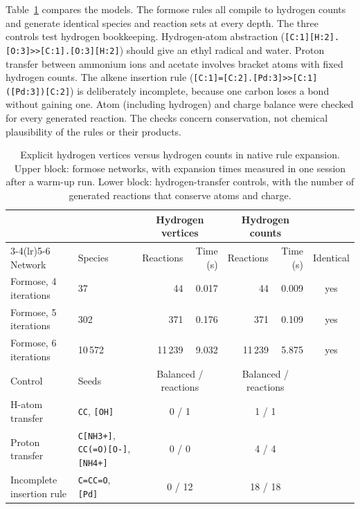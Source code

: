 \documentclass[pdflatex,referee]{../template/sn-jnl}
\theoremstyle{plain}%
\theoremstyle{definition}%
\theoremstyle{remark}%
\begin{document}
Table~\ref{tab:hydrogen_models} compares the models. The formose rules all compile to hydrogen counts and generate identical species and reaction sets at every depth. The three controls test hydrogen bookkeeping. Hydrogen-atom abstraction (\texttt{[C:1][H:2].[O:3]>>[C:1].[O:3][H:2]}) should give an ethyl radical and water. Proton transfer between ammonium ions and acetate involves bracket atoms with fixed hydrogen counts. The alkene insertion rule (\texttt{[C:1]=[C:2].[Pd:3]>>[C:1]([Pd:3])[C:2]}) is deliberately incomplete, because one carbon loses a bond without gaining one. Atom (including hydrogen) and charge balance were checked for every generated reaction. The checks concern conservation, not chemical plausibility of the rules or their products.

\begin{table}[htbp]
  \centering
  \caption{Explicit hydrogen vertices versus hydrogen counts in native rule expansion. Upper block: formose networks, with expansion times measured in one session after a warm-up run. Lower block: hydrogen-transfer controls, with the number of generated reactions that conserve atoms and charge.}
  \label{tab:hydrogen_models}
  \scriptsize
  \setlength{\tabcolsep}{3pt}
  \begin{tabular}{llrrrrc}
  \toprule
  & & \multicolumn{2}{c}{Hydrogen vertices} & \multicolumn{2}{c}{Hydrogen counts} & \\
  \cmidrule(lr){3-4}\cmidrule(lr){5-6}
  Network & Species & Reactions & Time (s) & Reactions & Time (s) & Identical \\
  \midrule
Formose, 4 iterations & 37 & 44 & 0.017 & 44 & 0.009 & yes \\
Formose, 5 iterations & 302 & 371 & 0.176 & 371 & 0.109 & yes \\
Formose, 6 iterations & 10\,572 & 11\,239 & 9.032 & 11\,239 & 5.875 & yes \\
\midrule
Control & Seeds & \multicolumn{2}{c}{Balanced / reactions} & \multicolumn{2}{c}{Balanced / reactions} & \\
\midrule
H-atom transfer & \texttt{CC}, \texttt{[OH]} & \multicolumn{2}{c}{0 / 1} & \multicolumn{2}{c}{1 / 1} & \\
Proton transfer & \texttt{C[NH3+]}, \texttt{CC(=O)[O-]}, \texttt{[NH4+]} & \multicolumn{2}{c}{0 / 0} & \multicolumn{2}{c}{4 / 4} & \\
Incomplete insertion rule & \texttt{C=CC=O}, \texttt{[Pd]} & \multicolumn{2}{c}{0 / 12} & \multicolumn{2}{c}{18 / 18} & \\
  \bottomrule
  \end{tabular}
\end{table}
\end{document}
